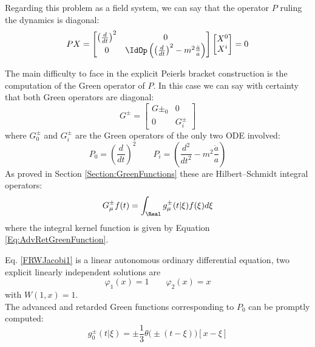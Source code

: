 \documentclass[Main]{subfiles}
\begin{document}
			Regarding this problem as a field system, we can say that the operator $P$ ruling the dynamics is diagonal:
			\begin{displaymath}
				P X =
				 \begin{bmatrix}  
				 \left(\frac{d}{dt}\right)^2 & 0 \\
				 0 & \IdOp \left( \left(\frac{d}{dt}\right)^2 - m^2 \frac{\ddot{a}}{a} \right)
				 \end{bmatrix}
				 \begin{bmatrix} X^0 \\ X^i  \end{bmatrix}
				 = 0
			\end{displaymath}
			
			The main difficulty to face in the explicit Peierls bracket construction is the computation of the Green operator of $P$.
			In this case we can say with certainty that both Green operators are diagonal:
			\begin{displaymath}
				G^\pm =
				 \begin{bmatrix}  
				 G\pm_0 & 0 \\
				 0 & G^\pm_i
				 \end{bmatrix}
			\end{displaymath}		
			where $G^\pm_0$ and $G^\pm_i$ are the Green operators of the only two ODE involved:
			\begin{displaymath}
				P_0 = \left(\frac{d}{dt}\right)^2 \qquad P_i=\left( \frac{d^2}{dt^2} - m^2 \frac{\ddot{a}}{a} \right)
			\end{displaymath}
			As proved in Section \ref{Section:GreenFunctions} these are  Hilbert–Schmidt integral operators:
			\begin{displaymath}
				G^\pm_\mu f(t) = \int_\Real g^\pm_\mu( t \vert \xi ) f(\xi) d\xi
			\end{displaymath}
			where the integral kernel function is given by  Equation \ref{Eq:AdvRetGreenFunction}.
			
			Eq. \ref{FRWJacobi1} is a linear autonomous ordinary differential equation, two explicit linearly independent solutions are 
			\begin{displaymath}
				\varphi_1(x)=1 \qquad \varphi_2(x)=x
			\end{displaymath} 
			with $W(1,x)=1$. \\
			The advanced and retarded Green functions corresponding to $P_0$ can be promptly computed:
			\begin{equation}\label{SimpleGreenFunction}
				g^\pm_0(t \vert \xi) = \pm \frac{1}{3}\theta\big(\pm(t-\xi)\big) \left[ x -\xi\right]
			\end{equation}
			
\end{document}
